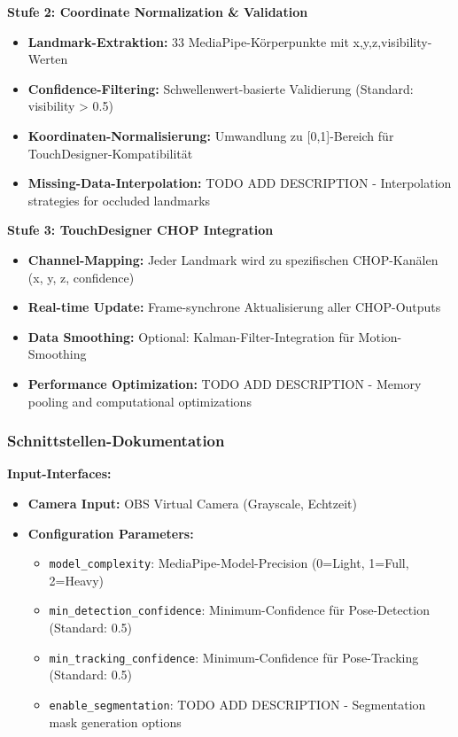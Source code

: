 \textbf{Stufe 2: Coordinate Normalization \& Validation}
\begin{itemize}
    \item \textbf{Landmark-Extraktion:} 33 MediaPipe-Körperpunkte mit x,y,z,visibility-Werten
    \item \textbf{Confidence-Filtering:} Schwellenwert-basierte Validierung (Standard: visibility > 0.5)
    \item \textbf{Koordinaten-Normalisierung:} Umwandlung zu [0,1]-Bereich für TouchDesigner-Kompatibilität
    \item \textbf{Missing-Data-Interpolation:} TODO ADD DESCRIPTION - Interpolation strategies for occluded landmarks
\end{itemize}

\textbf{Stufe 3: TouchDesigner CHOP Integration}
\begin{itemize}
    \item \textbf{Channel-Mapping:} Jeder Landmark wird zu spezifischen CHOP-Kanälen (x, y, z, confidence)
    \item \textbf{Real-time Update:} Frame-synchrone Aktualisierung aller CHOP-Outputs
    \item \textbf{Data Smoothing:} Optional: Kalman-Filter-Integration für Motion-Smoothing
    \item \textbf{Performance Optimization:} TODO ADD DESCRIPTION - Memory pooling and computational optimizations
\end{itemize}

\subsubsection{Schnittstellen-Dokumentation}

\textbf{Input-Interfaces:}
\begin{itemize}
    \item \textbf{Camera Input:} OBS Virtual Camera (Grayscale, Echtzeit)
    \item \textbf{Configuration Parameters:} 
    \begin{itemize}
        \item \texttt{model\_complexity}: MediaPipe-Model-Precision (0=Light, 1=Full, 2=Heavy)
        \item \texttt{min\_detection\_confidence}: Minimum-Confidence für Pose-Detection (Standard: 0.5)
        \item \texttt{min\_tracking\_confidence}: Minimum-Confidence für Pose-Tracking (Standard: 0.5)
        \item \texttt{enable\_segmentation}: TODO ADD DESCRIPTION - Segmentation mask generation options
    \end{itemize}
\end{itemize}

